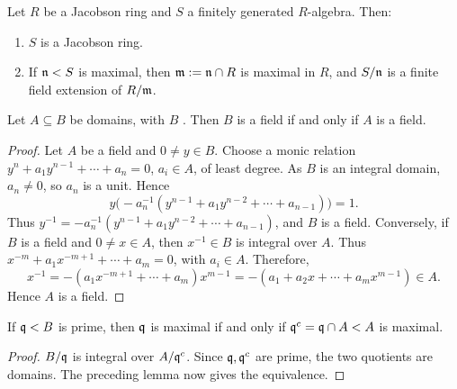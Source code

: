 \documentclass[11pt,a4paper]{article}
\begin{document}
\setcounter{theorem}{24}\begin{theorem}
Let $R$ be a Jacobson ring and $S$ a finitely generated $R$-algebra. Then:
\begin{enumerate}[label=(\roman*)]
\setcounter{enumi}{0}\item $S$ is a Jacobson ring.
\setcounter{enumi}{1}\item If $\mathfrak n<S$ is maximal, then $\mathfrak m:=\mathfrak n\cap R$ is maximal in $R$, and $S/\mathfrak n$ is a finite field extension of $R/\mathfrak m$.
\end{enumerate}
\end{theorem}
\setcounter{theorem}{25}\begin{lemma}
Let $A\subseteq B$ be domains, with $B$ . Then $B$ is a field if and only if $A$ is a field.
\end{lemma}
\begin{proof}
Let $A$ be a field and $0\ne y\in B$. Choose a monic relation $y^n+a_1y^{n-1}+\cdots+a_n=0$, $a_i\in A$, of least degree. As $B$ is an integral domain, $a_n\ne0$, so $a_n$ is a unit. Hence
\[
y\bigl(-a_n^{-1}(y^{n-1}+a_1y^{n-2}+\cdots+a_{n-1})\bigr)=1.
\]
Thus $y^{-1}=-a_n^{-1}(y^{n-1}+a_1y^{n-2}+\cdots+a_{n-1})$,
and $B$ is a field. Conversely, if $B$ is a field and $0\ne x\in A$, then $x^{-1}\in B$ is integral over $A$. Thus $x^{-m}+a_1x^{-m+1}+\cdots+a_m=0$, with $a_i\in A$. Therefore,
\[
x^{-1}=-(a_1x^{-m+1}+\cdots+a_m)x^{m-1}
=-(a_1+a_2x+\cdots+a_mx^{m-1})\in A.
\]
Hence $A$ is a field.
\end{proof}
\setcounter{theorem}{26}\begin{corollary}
If $\mathfrak q<B$ is prime, then $\mathfrak q$ is maximal if and only if $\mathfrak q^c=\mathfrak q\cap A<A$ is maximal.
\end{corollary}
\begin{proof}
$B/\mathfrak q$ is integral over $A/\mathfrak q^c$. Since $\mathfrak q,\mathfrak q^c$ are prime, the two quotients are domains.
The preceding lemma now gives the equivalence.
\end{proof}
\end{document}
